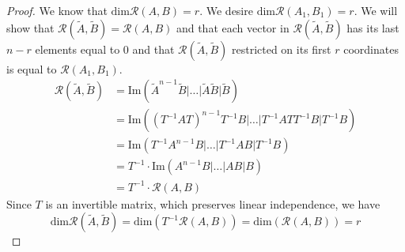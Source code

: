 \begin{proof}
	We know that $\text{dim}\mathcal{R}(A,B)=r$. We desire $\text{dim}\mathcal{R}(A_1,B_1)=r$. We will show that $\mathcal{R}(\widetilde{A},\widetilde{B})=\mathcal{R}(A,B)$ and that each vector in $\mathcal{R}(\widetilde{A},\widetilde{B})$ has its last $n-r$ elements equal to 0 and that $\mathcal{R}(\widetilde{A},\widetilde{B})$ restricted on its first $r$ coordinates is equal to $\mathcal{R}(A_1,B_1)$. 
	\begin{align*}
		\mathcal{R}(\widetilde{A},\widetilde{B})&=\text{Im}(\widetilde{A}^{n-1}\widetilde{B}|\ldots|\widetilde{A}\widetilde{B}|\widetilde{B}) \\
		&=\text{Im}((T^{-1}AT)^{n-1}T^{-1}B|\ldots|T^{-1}ATT^{-1}B|T^{-1}B) \\
		&=\text{Im}(T^{-1}A^{n-1}B|\ldots|T^{-1}AB|T^{-1}B) \\
		&=T^{-1}\cdot\text{Im}(A^{n-1}B|\ldots|AB|B) \\
		&=T^{-1}\cdot\mathcal{R}(A,B)
	\end{align*}
	Since $T$ is an invertible matrix, which preserves linear independence, we have $$\text{dim}\mathcal{R}(\widetilde{A},\widetilde{B})=\text{dim}(T^{-1}\mathcal{R}(A,B))=\text{dim}(\mathcal{R}(A,B))=r$$


\end{proof}
